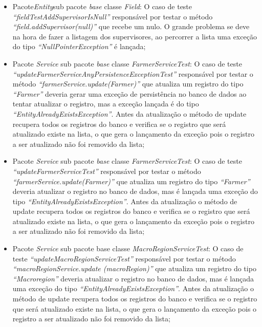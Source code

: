   \begin{itemize}
    \item Pacote\textit{Entity}sub pacote \textit{base} classe \textit{Field}: O caso de teste \textit{“fieldTestAddSupervisorIsNull”} responsável por testar o método \textit{“field.addSupervisor(null)”} que recebe um nulo. O grande problema se deve na hora de fazer a listagem dos supervisores, ao percorrer a lista uma exceção do tipo \textit{“NullPointerException”} é lançada;

  \item Pacote \textit{Service} sub pacote \textit{base} classe \textit{FarmerServiceTest}: O caso de teste \textit{“updateFarmerServiceAnyPersistenceExceptionTest”}  responsável por testar o método \textit{“farmerService.update(Farmer)”} que atualiza um registro do tipo \textit{“Farmer”} deveria gerar uma exceção de persistência no banco de dados   ao tentar atualizar o registro, mas a exceção lançada é do tipo \textit{“EntityAlreadyExistsException”}. Antes da atualização o método de update recupera todos os registros do banco e verifica se o registro que será atualizado existe na lista, o que gera o lançamento da exceção pois o registro a ser atualizado não foi removido da lista;

  \item Pacote \textit{Service} sub pacote \textit{base} classe \textit{FarmerServiceTest}: O caso de teste \textit{“updateFarmerServiceTest”}  responsável por testar o método \textit{“farmerService.update(Farmer)”} que atualiza um registro do tipo \textit{“Farmer”} deveria atualizar o registro no banco de dados, mas é lançada uma exceção do tipo \textit{“EntityAlreadyExistsException”}. Antes da atualização o método de update recupera todos os registros do banco e verifica se o registro que será atualizado existe na lista, o que gera o lançamento da exceção pois o registro a ser atualizado não foi removido da lista;

  \item Pacote \textit{Service} sub pacote base classe \textit{MacroRegionServiceTest}: O caso de teste \textit{“updateMacroRegionServiceTest”  }responsável por testar o método \textit{“macroRegionService.update
  (macroRegion)”} que atualiza um registro do tipo \textit{“Macroregion” }deveria atualizar o registro no banco de dados, mas é lançada uma exceção do tipo \textit{“EntityAlreadyExistsException”}. Antes da atualização o método de update recupera todos os registros do banco e verifica se o registro que será atualizado existe na lista, o que gera o lançamento da exceção pois o registro a ser atualizado não foi removido da lista;


\end{itemize}

